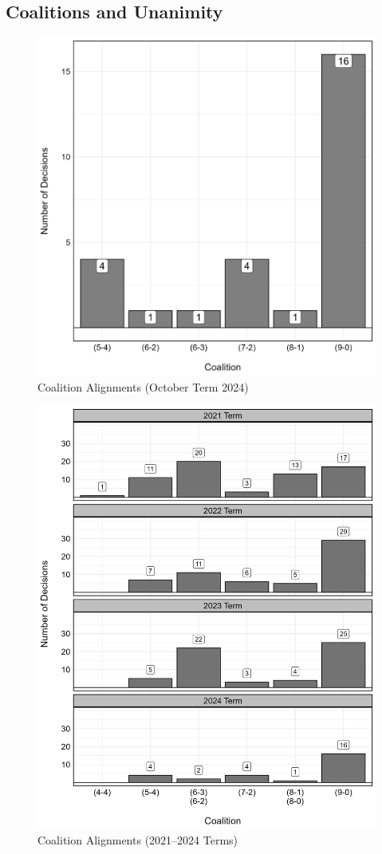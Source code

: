 
\newpage
\subsection{Coalitions and Unanimity}


\begin{figure}[h]
\centering
\caption{Coalition Alignments (October Term 2024)}
\includegraphics[width=0.9\linewidth]{../decisions/figures/coalitions_current_term.png}
\end{figure}

\newpage

\begin{figure}[h]
\centering
\caption{Coalition Alignments (2021--2024 Terms)}
\includegraphics[width=0.9\linewidth]{../decisions/figures/coalitions_longitudinal_figure.png}
\end{figure}





